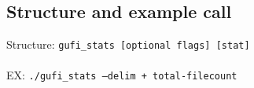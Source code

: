 \subsection{Structure and example call}
Structure: \texttt{gufi\_stats [optional flags] [stat] }
\\
\\
EX: \texttt{./gufi\_stats --delim + total-filecount}